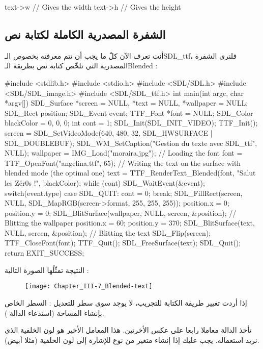 \begin{Csource}
text->w // Gives the width
text->h // Gives the height
\end{Csource}

\subsection{الشفرة المصدرية الكاملة لكتابة نص}

أنت تعرف الآن كلّ ما يجب أن تتم معرفته بخصوص الـ\textenglish{SDL\_ttf}،
فلنرى الشفرة المصدرية التي تلخّص كتابة نص بطريقة الـ\textenglish{Blended} :

\begin{Csource}
#include <stdlib.h>
#include <stdio.h>
#include <SDL/SDL.h>
#include <SDL/SDL_image.h>
#include <SDL/SDL_ttf.h>
int main(int argc, char *argv[])
{
	SDL_Surface *screen = NULL, *text = NULL, *wallpaper = NULL;
	SDL_Rect position;
	SDL_Event event;
	TTF_Font *font = NULL;
	SDL_Color blackColor = {0, 0, 0};
	int cont = 1;
	SDL_Init(SDL_INIT_VIDEO);
	TTF_Init();	
	screen = SDL_SetVideoMode(640, 480, 32, SDL_HWSURFACE | SDL_DOUBLEBUF);
	SDL_WM_SetCaption("Gestion du texte avec SDL_ttf", NULL);
	wallpaper = IMG_Load("moraira.jpg");
	// Loading the font 
	font = TTF_OpenFont("angelina.ttf", 65);
	// Writing the text on the surface with blended mode (the optimal one)
	text = TTF_RenderText_Blended(font, "Salut les Zér0s !", blackColor);
	while (cont)	
	{
		SDL_WaitEvent(&event);
		switch(event.type)
		{
			case SDL_QUIT:
			cont = 0;
			break;
		}
		SDL_FillRect(screen, NULL, SDL_MapRGB(screen->format, 255, 255, 255));
		position.x = 0;
		position.y = 0;
		SDL_BlitSurface(wallpaper, NULL, screen, &position); // Blitting the wallpaper
		position.x = 60;
		position.y = 370;
		SDL_BlitSurface(text, NULL, screen, &position); // Blitting the text
		SDL_Flip(screen);
	}
	TTF_CloseFont(font);
	TTF_Quit();
	SDL_FreeSurface(text);
	SDL_Quit();
	return EXIT_SUCCESS;
}
\end{Csource}

النتيجة تمثّلُها الصورة التالية :

\begin{figure}[H]
	\centering
	\texttt{[image: Chapter\_III-7\_Blended-text]}
\end{figure}

إذا أردت تغيير طريقة الكتابة للتجريب، لا يوجد سوى سطر للتعديل : السطر الخاص بإنشاء المساحة (استدعاء الدالة 
).

\begin{warning}
تأخذ الدالة
معاملا رابعا على عكس الأخرتين. هذا المعامل الأخير هو لون الخلفية الذي نريد استعماله. يجب عليك إذا إنشاء متغير من نوع
للإشارة إلى لون الخلفية (مثلا أبيض).
\end{warning}

